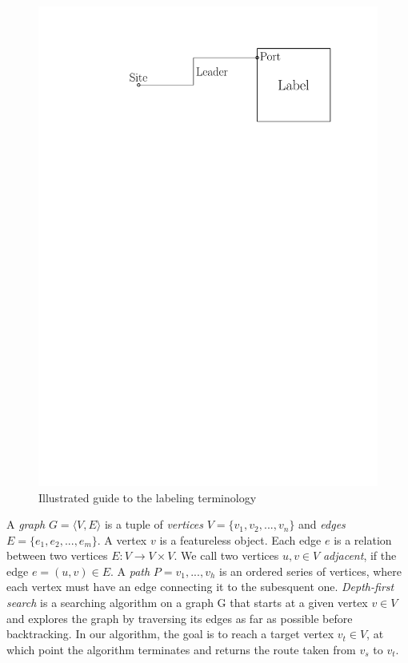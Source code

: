 \documentclass[11pt,a4paper]{vutinfth}
\begin{document}
\begin{figure}%
 \captionsetup{justification=centering, margin=0.75cm}
 \centering
  \includegraphics[scale=0.5]{IPE_TerminologyDrawing.pdf}
  \caption{Illustrated guide to the labeling terminology}
 \label{fig:term}
\end{figure}

A \emph{graph} $G=\langle V, E \rangle$ is a tuple of \emph{vertices} $V=\{v_1, v_2, ..., v_n\}$ and \emph{edges} $E=\{e_1, e_2, ..., e_m\}$. A vertex $v$ is a featureless object. %
 Each edge $e$ is a relation between two vertices $E:V\rightarrow  V\times V$. %
We call two vertices $u,v \in V$ \emph{adjacent}, if the edge $e=(u,v) \in E$.
 A \emph{path} $P=v_1, ..., v_h$ is an ordered series of vertices, where each vertex must have an edge connecting it to the subesquent one.
 \emph{Depth-first search} is a searching algorithm on a graph G that starts at a given vertex $v \in V$ and explores the graph by traversing its edges as far as possible before backtracking. In our algorithm, the goal is to reach a target vertex $v_t \in V$, at which point the algorithm terminates and returns the route taken from $v_s$ to $v_t$.
\end{document}
